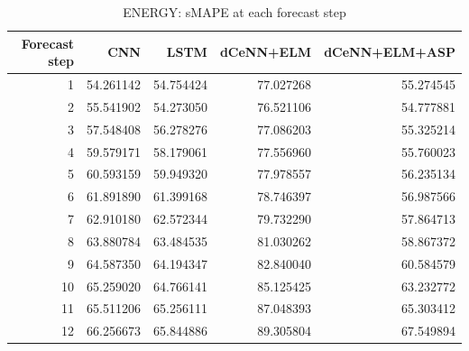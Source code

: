 \begin{table}
\caption{ENERGY: sMAPE at each forecast step}
\begin{tabular}{rrrrr}
\toprule
Forecast step & CNN & LSTM & dCeNN+ELM & dCeNN+ELM+ASP \\
\midrule
1 & 54.261142 & 54.754424 & 77.027268 & 55.274545 \\
2 & 55.541902 & 54.273050 & 76.521106 & 54.777881 \\
3 & 57.548408 & 56.278276 & 77.086203 & 55.325214 \\
4 & 59.579171 & 58.179061 & 77.556960 & 55.760023 \\
5 & 60.593159 & 59.949320 & 77.978557 & 56.235134 \\
6 & 61.891890 & 61.399168 & 78.746397 & 56.987566 \\
7 & 62.910180 & 62.572344 & 79.732290 & 57.864713 \\
8 & 63.880784 & 63.484535 & 81.030262 & 58.867372 \\
9 & 64.587350 & 64.194347 & 82.840040 & 60.584579 \\
10 & 65.259020 & 64.766141 & 85.125425 & 63.232772 \\
11 & 65.511206 & 65.256111 & 87.048393 & 65.303412 \\
12 & 66.256673 & 65.844886 & 89.305804 & 67.549894 \\
\bottomrule
\end{tabular}
\end{table}
